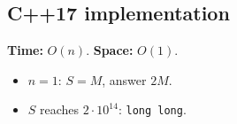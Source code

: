 \subsection*{C++17 implementation}

\begin{complexitybox}
\textbf{Time:} $O(n)$. \textbf{Space:} $O(1)$.
\end{complexitybox}

\begin{pitfallbox}
\begin{itemize}
  \item $n=1$: $S=M$, answer $2M$.
  \item $S$ reaches $2\cdot10^{14}$: \texttt{long long}.
\end{itemize}
\end{pitfallbox}
